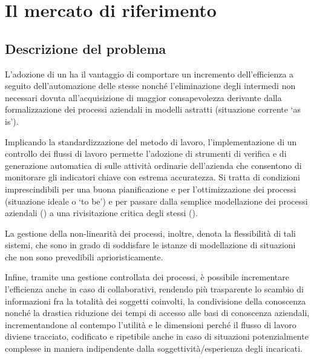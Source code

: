 \section{Il mercato di riferimento}\label{sec:whattheproblemis}

\subsection{Descrizione del problema}

L'adozione di un  ha il vantaggio di comportare un incremento dell'efficienza a seguito dell'automazione delle stesse nonché l'eliminazione degli  intermedi non necessari dovuta all'acquisizione di maggior consapevolezza derivante dalla formalizzazione dei processi aziendali in modelli astratti (situazione corrente `as is').

Implicando la standardizzazione del metodo di lavoro, l'implementazione di un controllo dei flussi di lavoro permette l'adozione di strumenti di verifica e di generazione automatica di  sulle attività ordinarie dell'azienda che consentono di monitorare gli indicatori chiave con estrema accuratezza. Si tratta di condizioni imprescindibili per una buona pianificazione e per l'ottimizzazione dei processi (situazione ideale o `to be') e per passare dalla semplice modellazione dei processi aziendali (\bsn {}) a una rivisitazione critica degli stessi (\bsn {}).

La gestione della non-linearità dei processi, inoltre, denota la flessibilità di tali sistemi, che sono in grado di soddisfare le istanze di modellazione di situazioni che non sono prevedibili aprioristicamente.

Infine, tramite una gestione controllata dei processi, è possibile incrementare l'efficienza anche in caso di  collaborativi, rendendo più trasparente lo scambio di informazioni fra la totalità dei soggetti coinvolti, la condivisione della conoscenza nonché la drastica riduzione dei tempi di accesso alle basi di conoscenza aziendali, incrementandone al contempo l'utilità e le dimensioni perché il flusso di lavoro diviene tracciato, codificato e ripetibile anche in caso di situazioni potenzialmente complesse in maniera indipendente dalla soggettività/esperienza degli incaricati.


